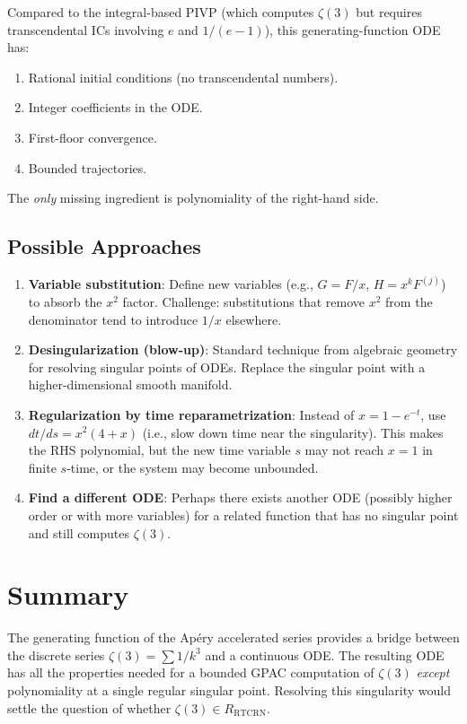 \documentclass[11pt]{article}
\theoremstyle{definition}
\begin{document}
Compared to the integral-based PIVP (which computes $\zeta(3)$ but requires transcendental ICs involving $e$ and $1/(e-1)$), this generating-function ODE has:
\begin{enumerate}
  \item Rational initial conditions (no transcendental numbers).
  \item Integer coefficients in the ODE.
  \item First-floor convergence.
  \item Bounded trajectories.
\end{enumerate}
The \emph{only} missing ingredient is polynomiality of the right-hand side.

\subsection{Possible Approaches}

\begin{enumerate}
  \item \textbf{Variable substitution}: Define new variables (e.g., $G = F/x$, $H = x^k F^{(j)}$) to absorb the $x^2$ factor. Challenge: substitutions that remove $x^2$ from the denominator tend to introduce $1/x$ elsewhere.

  \item \textbf{Desingularization (blow-up)}: Standard technique from algebraic geometry for resolving singular points of ODEs. Replace the singular point with a higher-dimensional smooth manifold.

  \item \textbf{Regularization by time reparametrization}: Instead of $x = 1-e^{-t}$, use $dt/ds = x^2(4+x)$ (i.e., slow down time near the singularity). This makes the RHS polynomial, but the new time variable $s$ may not reach $x=1$ in finite $s$-time, or the system may become unbounded.

  \item \textbf{Find a different ODE}: Perhaps there exists another ODE (possibly higher order or with more variables) for a related function that has no singular point and still computes $\zeta(3)$.
\end{enumerate}

\section{Summary}

The generating function of the Ap\'ery accelerated series provides a bridge between the discrete series $\zeta(3) = \sum 1/k^3$ and a continuous ODE. The resulting ODE has all the properties needed for a bounded GPAC computation of $\zeta(3)$ \emph{except} polynomiality at a single regular singular point. Resolving this singularity would settle the question of whether $\zeta(3) \in R_{\mathrm{RTCRN}}$.
\end{document}
